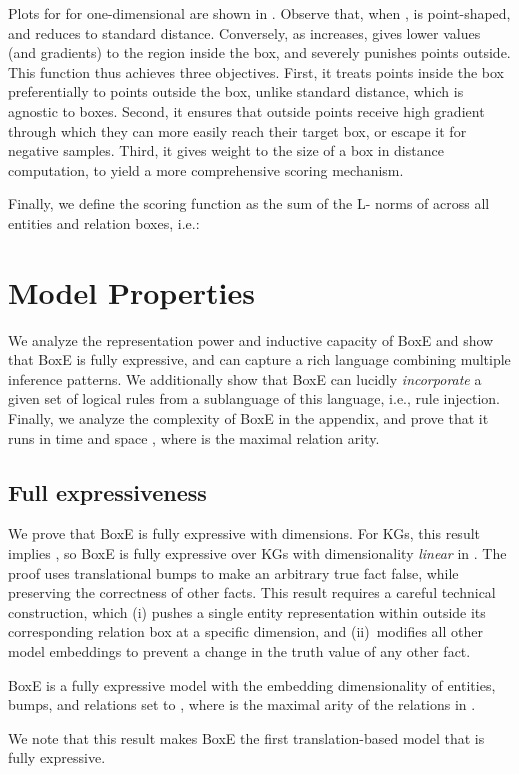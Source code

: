 \documentclass{article}
\begin{document}
Plots for  for one-dimensional  are shown in . Observe that, when ,  is point-shaped, and  reduces to standard  distance. Conversely, as  increases,  gives lower values (and gradients) to the region inside the box, and severely punishes points outside. 
This function thus achieves three objectives. First, it treats points inside the box preferentially to points outside the box, unlike  standard distance, which is agnostic to boxes. Second, it ensures that outside points receive high gradient through which they can more easily reach their target box, or escape it for negative samples. Third, it gives weight to the size of a box in distance computation, to yield a more comprehensive scoring mechanism.

Finally, we 
define the scoring function as the sum of the L- norms of  across all  entities and relation boxes, i.e.: 


\section{Model Properties}
\label{sec:BoxEProps}
We analyze the representation power and inductive capacity of BoxE and show that BoxE is fully expressive, and can capture a rich language combining multiple inference patterns. We additionally show that BoxE can lucidly \emph{incorporate} a given set of logical rules from a sublanguage of this language, i.e., rule injection. Finally, we analyze the complexity of BoxE in the appendix, and prove that it runs in time  and space , where  is the maximal relation arity. 

\subsection{Full expressiveness}
We prove that BoxE is fully expressive with  dimensions. For KGs, this result implies , so BoxE is fully expressive over KGs with dimensionality \emph{linear} in . The proof uses translational bumps to make an arbitrary true fact  false, while preserving the correctness of other facts. This result requires a careful technical construction, which (i) pushes a single entity representation within  outside its corresponding relation box at a specific dimension, and (ii)~modifies all other model embeddings to prevent a change in the truth value of any other fact.  


\begin{theorem}
\label{thm:fullexp}
BoxE is a fully expressive model with the embedding dimensionality  of entities, bumps, and relations set to , where  is the maximal arity of the relations in .
\end{theorem}
We note that this result makes BoxE the first translation-based model that is fully expressive. 
\end{document}

